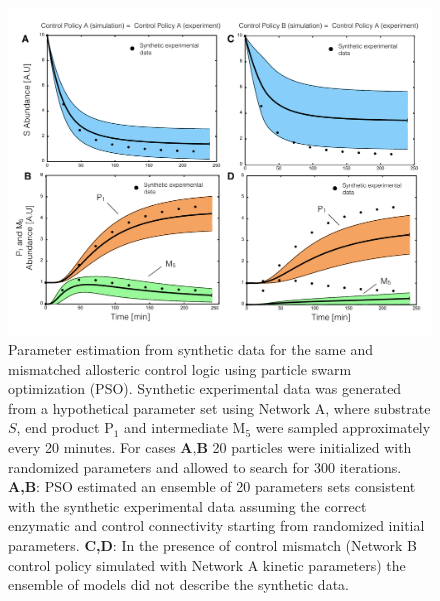 \documentclass[12pt]{article}
\begin{document}
\clearpage

\begin{figure}
\centering
\includegraphics[width=1.0\textwidth]{./figs/Figure-5-ParameterFit.pdf}
\caption{Parameter estimation from synthetic data for the same and mismatched allosteric control logic using particle swarm optimization (PSO). 
Synthetic experimental data was generated from a hypothetical parameter set using Network A, 
where substrate $S$, end product P$_{1}$ and intermediate M$_5$ were sampled approximately every 20 minutes. 
For cases $\textbf{A,B}$ 20 particles were initialized with randomized parameters and allowed to search for 300 iterations. 
\textbf{A,B}: PSO estimated an ensemble of 20 parameters sets consistent with the synthetic experimental data assuming the correct
enzymatic and control connectivity starting from randomized initial parameters.
\textbf{C,D}: In the presence of control mismatch (Network B control policy simulated with Network A kinetic parameters) 
the ensemble of models did not describe the synthetic data. 
}\label{fig-parameter-fit}
\end{figure}

\clearpage
\end{document}
